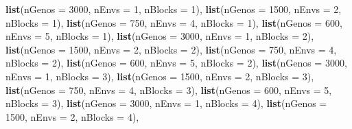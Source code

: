 \documentclass[
]{article}
\newenvironment{Shaded}{\begin{snugshade}}{\end{snugshade}}
\newcommand{\AttributeTok}[1]{\textcolor[rgb]{0.13,0.29,0.53}{#1}}
\newcommand{\DecValTok}[1]{\textcolor[rgb]{0.00,0.00,0.81}{#1}}
\newcommand{\FunctionTok}[1]{\textcolor[rgb]{0.13,0.29,0.53}{\textbf{#1}}}
\newcommand{\NormalTok}[1]{#1}
\begin{document}
\begin{Shaded}
\begin{Highlighting}[]
  \FunctionTok{list}\NormalTok{(}\AttributeTok{nGenos =} \DecValTok{3000}\NormalTok{, }\AttributeTok{nEnvs =} \DecValTok{1}\NormalTok{, }\AttributeTok{nBlocks =} \DecValTok{1}\NormalTok{),}
  \FunctionTok{list}\NormalTok{(}\AttributeTok{nGenos =} \DecValTok{1500}\NormalTok{, }\AttributeTok{nEnvs =} \DecValTok{2}\NormalTok{, }\AttributeTok{nBlocks =} \DecValTok{1}\NormalTok{),}
  \FunctionTok{list}\NormalTok{(}\AttributeTok{nGenos =} \DecValTok{750}\NormalTok{, }\AttributeTok{nEnvs =} \DecValTok{4}\NormalTok{, }\AttributeTok{nBlocks =} \DecValTok{1}\NormalTok{),}
  \FunctionTok{list}\NormalTok{(}\AttributeTok{nGenos =} \DecValTok{600}\NormalTok{, }\AttributeTok{nEnvs =} \DecValTok{5}\NormalTok{, }\AttributeTok{nBlocks =} \DecValTok{1}\NormalTok{),}
  \FunctionTok{list}\NormalTok{(}\AttributeTok{nGenos =} \DecValTok{3000}\NormalTok{, }\AttributeTok{nEnvs =} \DecValTok{1}\NormalTok{, }\AttributeTok{nBlocks =} \DecValTok{2}\NormalTok{),}
  \FunctionTok{list}\NormalTok{(}\AttributeTok{nGenos =} \DecValTok{1500}\NormalTok{, }\AttributeTok{nEnvs =} \DecValTok{2}\NormalTok{, }\AttributeTok{nBlocks =} \DecValTok{2}\NormalTok{),}
  \FunctionTok{list}\NormalTok{(}\AttributeTok{nGenos =} \DecValTok{750}\NormalTok{, }\AttributeTok{nEnvs =} \DecValTok{4}\NormalTok{, }\AttributeTok{nBlocks =} \DecValTok{2}\NormalTok{),}
  \FunctionTok{list}\NormalTok{(}\AttributeTok{nGenos =} \DecValTok{600}\NormalTok{, }\AttributeTok{nEnvs =} \DecValTok{5}\NormalTok{, }\AttributeTok{nBlocks =} \DecValTok{2}\NormalTok{),}
  \FunctionTok{list}\NormalTok{(}\AttributeTok{nGenos =} \DecValTok{3000}\NormalTok{, }\AttributeTok{nEnvs =} \DecValTok{1}\NormalTok{, }\AttributeTok{nBlocks =} \DecValTok{3}\NormalTok{),}
  \FunctionTok{list}\NormalTok{(}\AttributeTok{nGenos =} \DecValTok{1500}\NormalTok{, }\AttributeTok{nEnvs =} \DecValTok{2}\NormalTok{, }\AttributeTok{nBlocks =} \DecValTok{3}\NormalTok{),}
  \FunctionTok{list}\NormalTok{(}\AttributeTok{nGenos =} \DecValTok{750}\NormalTok{, }\AttributeTok{nEnvs =} \DecValTok{4}\NormalTok{, }\AttributeTok{nBlocks =} \DecValTok{3}\NormalTok{),}
  \FunctionTok{list}\NormalTok{(}\AttributeTok{nGenos =} \DecValTok{600}\NormalTok{, }\AttributeTok{nEnvs =} \DecValTok{5}\NormalTok{, }\AttributeTok{nBlocks =} \DecValTok{3}\NormalTok{),}
  \FunctionTok{list}\NormalTok{(}\AttributeTok{nGenos =} \DecValTok{3000}\NormalTok{, }\AttributeTok{nEnvs =} \DecValTok{1}\NormalTok{, }\AttributeTok{nBlocks =} \DecValTok{4}\NormalTok{),}
  \FunctionTok{list}\NormalTok{(}\AttributeTok{nGenos =} \DecValTok{1500}\NormalTok{, }\AttributeTok{nEnvs =} \DecValTok{2}\NormalTok{, }\AttributeTok{nBlocks =} \DecValTok{4}\NormalTok{),}

\end{Highlighting}
\end{Shaded}
\end{document}
